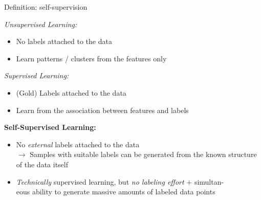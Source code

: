 
\begin{frame}{Definition: self-supervision}

	\vfill 
	
	\textit{Unsupervised Learning:}

	\begin{itemize}
		\item No labels attached to the data
		\item Learn patterns / clusters from the features only
	\end{itemize}
	
	\textit{Supervised Learning:}

	\begin{itemize}
		\item (Gold) Labels attached to the data
		\item Learn from the association between features and labels
	\end{itemize}
	
	\textbf{Self-Supervised Learning:}

	\begin{itemize}
		\item No \textit{external} labels attached to the data\\
					$\to$ Samples with suitable labels can be generated from the known structure of the data itself 
		\item \textit{Technically} supervised learning, but \textit{no labeling effort} $+$ simultan-\\eous ability to generate massive amounts of labeled data points
	\end{itemize}
	
	\vfill 
	
\end{frame}


